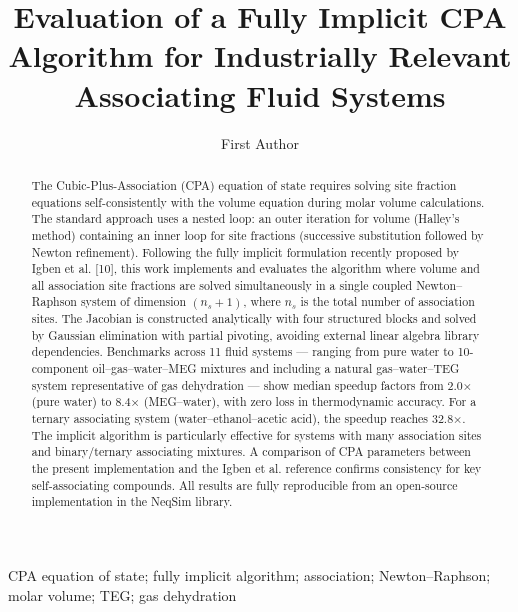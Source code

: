 \documentclass[review,3p]{elsarticle}
\begin{document}
\linenumbers
\doublespacing

\begin{frontmatter}

\title{Evaluation of a Fully Implicit CPA Algorithm for Industrially Relevant Associating Fluid Systems}

\author[inst1]{First Author}


\begin{abstract}
The Cubic-Plus-Association (CPA) equation of state requires solving site fraction equations self-consistently with the volume equation during molar volume calculations. The standard approach uses a nested loop: an outer iteration for volume (Halley's method) containing an inner loop for site fractions (successive substitution followed by Newton refinement). Following the fully implicit formulation recently proposed by Igben et al. [10], this work implements and evaluates the algorithm where volume and all association site fractions are solved simultaneously in a single coupled Newton–Raphson system of dimension $(n_s + 1)$, where $n_s$ is the total number of association sites. The Jacobian is constructed analytically with four structured blocks and solved by Gaussian elimination with partial pivoting, avoiding external linear algebra library dependencies. Benchmarks across 11 fluid systems — ranging from pure water to 10-component oil–gas–water–MEG mixtures and including a natural gas–water–TEG system representative of gas dehydration — show median speedup factors from 2.0× (pure water) to 8.4× (MEG–water), with zero loss in thermodynamic accuracy. For a ternary associating system (water–ethanol–acetic acid), the speedup reaches 32.8×. The implicit algorithm is particularly effective for systems with many association sites and binary/ternary associating mixtures. A comparison of CPA parameters between the present implementation and the Igben et al. reference confirms consistency for key self-associating compounds. All results are fully reproducible from an open-source implementation in the NeqSim library.
\end{abstract}

\begin{keyword}
CPA equation of state; fully implicit algorithm; association; Newton–Raphson; molar volume; TEG; gas dehydration
\end{keyword}


\end{frontmatter}
\end{document}
